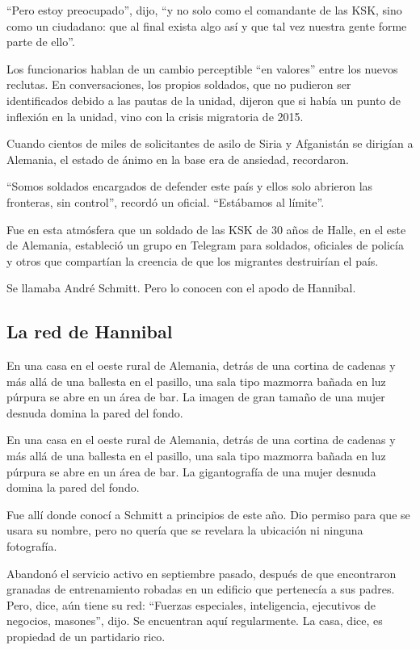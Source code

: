 ``Pero estoy preocupado'', dijo, ``y no solo como el comandante de las
KSK, sino como un ciudadano: que al final exista algo así y que tal vez
nuestra gente forme parte de ello''.

Los funcionarios hablan de un cambio perceptible ``en valores'' entre
los nuevos reclutas. En conversaciones, los propios soldados, que no
pudieron ser identificados debido a las pautas de la unidad, dijeron que
si había un punto de inflexión en la unidad, vino con la crisis
migratoria de 2015.

Cuando cientos de miles de solicitantes de asilo de Siria y Afganistán
se dirigían a Alemania, el estado de ánimo en la base era de ansiedad,
recordaron.

``Somos soldados encargados de defender este país y ellos solo abrieron
las fronteras, sin control'', recordó un oficial. ``Estábamos al
límite''.

Fue en esta atmósfera que un soldado de las KSK de 30 años de Halle, en
el este de Alemania, estableció un grupo en Telegram para soldados,
oficiales de policía y otros que compartían la creencia de que los
migrantes destruirían el país.

Se llamaba André Schmitt. Pero lo conocen con el apodo de Hannibal.

\hypertarget{la-red-de-hannibal}{%
\subsection{La red de Hannibal}\label{la-red-de-hannibal}}

En una casa en el oeste rural de Alemania, detrás de una cortina de
cadenas y más allá de una ballesta en el pasillo, una sala tipo mazmorra
bañada en luz púrpura se abre en un área de bar. La imagen de gran
tamaño de una mujer desnuda domina la pared del fondo.

En una casa en el oeste rural de Alemania, detrás de una cortina de
cadenas y más allá de una ballesta en el pasillo, una sala tipo mazmorra
bañada en luz púrpura se abre en un área de bar. La gigantografía de una
mujer desnuda domina la pared del fondo.

Fue allí donde conocí a Schmitt a principios de este año. Dio permiso
para que se usara su nombre, pero no quería que se revelara la ubicación
ni ninguna fotografía.

Abandonó el servicio activo en septiembre pasado, después de que
encontraron granadas de entrenamiento robadas en un edificio que
pertenecía a sus padres. Pero, dice, aún tiene su red: ``Fuerzas
especiales, inteligencia, ejecutivos de negocios, masones'', dijo. Se
encuentran aquí regularmente. La casa, dice, es propiedad de un
partidario rico.

